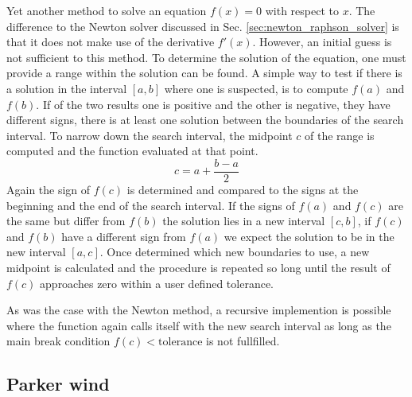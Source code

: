 \documentclass{aa}
\begin{document}
Yet another method to solve an equation \(f(x) = 0\) with respect to \(x\). The
difference to the Newton solver discussed in Sec.
\ref{sec:newton_raphson_solver} is that it does not make use of the derivative
\(f'(x)\). However, an initial guess is not sufficient to this method. To
determine the solution of the equation, one must provide a range within the
solution can be found. A simple way to test if there is a solution in the
interval \([a, b]\) where one is suspected, is to compute \(f(a)\) and \(f(b)\).
If of the two results one is positive and the other is negative, they have
different signs, there is at least one solution between the boundaries of the
search interval. To narrow down the search interval, the midpoint \(c\) of the range
is computed and the function evaluated at that point.
\begin{equation}
    c = a + \frac{b - a}{2}
\end{equation}
Again the sign of \(f(c)\) is determined and compared to the signs at the
beginning and the end of the search interval. If the signs of \(f(a)\) and
\(f(c)\) are the same but differ from \(f(b)\) the solution lies in a new
interval \([c, b]\), if \(f(c)\) and \(f(b)\) have a different sign from
\(f(a)\) we expect the solution to be in the new interval \([a, c]\). Once
determined which new boundaries to use, a new midpoint is calculated and the
procedure is repeated so long until the result of \(f(c)\) approaches zero 
within a user defined tolerance.

As was the case with the Newton method, a recursive implemention is possible
where the function again calls itself with the new search interval as long as
the main break condition \(f(c) < \mathrm{tolerance}\) is not fullfilled.

\subsection{Parker wind}%
\label{ssub:parker_wind}
\end{document}
